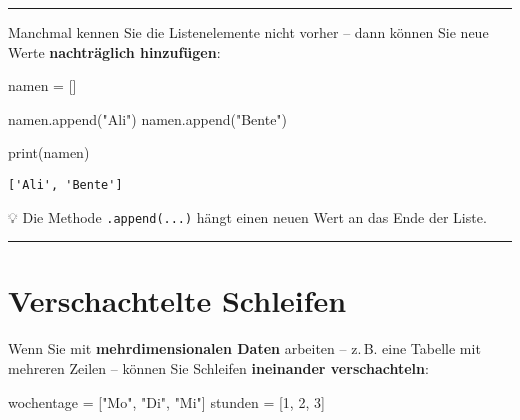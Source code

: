 \documentclass[
  letterpaper,
  DIV=11,
  numbers=noendperiod]{scrreprt}
\newenvironment{Shaded}{\begin{snugshade}}{\end{snugshade}}
\newcommand{\BuiltInTok}[1]{\textcolor[rgb]{0.00,0.23,0.31}{#1}}
\newcommand{\DecValTok}[1]{\textcolor[rgb]{0.68,0.00,0.00}{#1}}
\newcommand{\NormalTok}[1]{\textcolor[rgb]{0.00,0.23,0.31}{#1}}
\newcommand{\OperatorTok}[1]{\textcolor[rgb]{0.37,0.37,0.37}{#1}}
\newcommand{\StringTok}[1]{\textcolor[rgb]{0.13,0.47,0.30}{#1}}
\begin{document}
\begin{center}\rule{0.5\linewidth}{0.5pt}\end{center}

\begin{tcolorbox}[enhanced jigsaw, breakable, opacityback=0, left=2mm, coltitle=black, leftrule=.75mm, colframe=quarto-callout-tip-color-frame, opacitybacktitle=0.6, toprule=.15mm, bottomtitle=1mm, titlerule=0mm, toptitle=1mm, title=\textcolor{quarto-callout-tip-color}{\faLightbulb}\hspace{0.5em}{Listen erweitern: \texttt{.append()}}, colbacktitle=quarto-callout-tip-color!10!white, arc=.35mm, bottomrule=.15mm, rightrule=.15mm, colback=white]

Manchmal kennen Sie die Listenelemente nicht vorher -- dann können Sie
neue Werte \textbf{nachträglich hinzufügen}:

\begin{Shaded}
\begin{Highlighting}[]
\NormalTok{namen }\OperatorTok{=}\NormalTok{ []}

\NormalTok{namen.append(}\StringTok{"Ali"}\NormalTok{)}
\NormalTok{namen.append(}\StringTok{"Bente"}\NormalTok{)}

\BuiltInTok{print}\NormalTok{(namen)}
\end{Highlighting}
\end{Shaded}

\begin{verbatim}
['Ali', 'Bente']
\end{verbatim}

💡 Die Methode \texttt{.append(...)} hängt einen neuen Wert an das Ende
der Liste.

\begin{center}\rule{0.5\linewidth}{0.5pt}\end{center}

\section{Verschachtelte Schleifen}\label{verschachtelte-schleifen}

Wenn Sie mit \textbf{mehrdimensionalen Daten} arbeiten -- z.\,B. eine
Tabelle mit mehreren Zeilen -- können Sie Schleifen \textbf{ineinander
verschachteln}:

\begin{Shaded}
\begin{Highlighting}[]
\NormalTok{wochentage }\OperatorTok{=}\NormalTok{ [}\StringTok{"Mo"}\NormalTok{, }\StringTok{"Di"}\NormalTok{, }\StringTok{"Mi"}\NormalTok{]}
\NormalTok{stunden }\OperatorTok{=}\NormalTok{ [}\DecValTok{1}\NormalTok{, }\DecValTok{2}\NormalTok{, }\DecValTok{3}\NormalTok{]}


\end{Highlighting}
\end{Shaded}
\end{tcolorbox}
\end{document}
